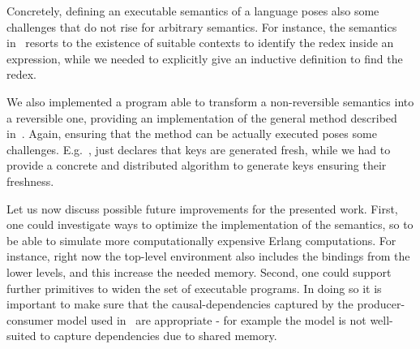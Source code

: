 \documentclass{article}[12pt,a4paper]
\theoremstyle{definition}
\begin{document}
Concretely, defining an executable semantics of a language poses also
some challenges that do not rise for arbitrary semantics. For
instance, the semantics in~\cite{Gonzalez-AbrilV21} resorts to the
existence of suitable contexts to identify the redex inside an
expression, while we needed to explicitly give an inductive definition
to find the redex.

We also implemented a program able to transform a non-reversible
semantics into a reversible one, providing an implementation of the
general method described in~\cite{LaneseM20}. Again, ensuring that the
method can be actually executed poses some challenges.
E.g.~\cite{LaneseM20}, just declares that
keys are generated fresh, while we had to provide a concrete and
distributed algorithm to generate keys ensuring their freshness.

Let us now discuss possible future improvements for the presented
work. First, one could investigate ways to optimize the implementation
of the semantics, so to be able to simulate more computationally
expensive Erlang computations. For instance, right now the top-level
environment also includes the bindings from the lower levels, and this
increase the needed memory.  Second, one could support further
primitives to widen the set of executable programs. In doing so it is
important to make sure that the causal-dependencies captured by the
producer-consumer model used in~\cite{LaneseM20} are appropriate - for
example the model is not well-suited to capture dependencies due to
shared memory.



\end{document}

